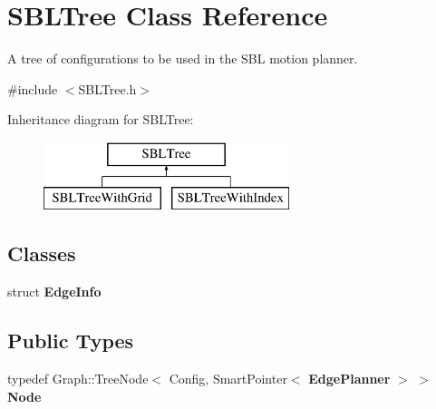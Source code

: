 \section{S\+B\+L\+Tree Class Reference}
\label{classSBLTree}


A tree of configurations to be used in the S\+BL motion planner.  




{\ttfamily \#include $<$S\+B\+L\+Tree.\+h$>$}

Inheritance diagram for S\+B\+L\+Tree\+:\begin{figure}[H]
\begin{center}
\leavevmode
\includegraphics[height=2.000000cm]{classSBLTree}
\end{center}
\end{figure}
\subsection*{Classes}
\begin{DoxyCompactItemize}
\item 
struct {\bf Edge\+Info}
\end{DoxyCompactItemize}
\subsection*{Public Types}
\begin{DoxyCompactItemize}
\item 
typedef Graph\+::\+Tree\+Node$<$ Config, Smart\+Pointer$<$ {\bf Edge\+Planner} $>$ $>$ {\bfseries Node}\label{classSBLTree_a91f69b90c6e2fc372a31c97a87d3aa15}

\end{DoxyCompactItemize}
